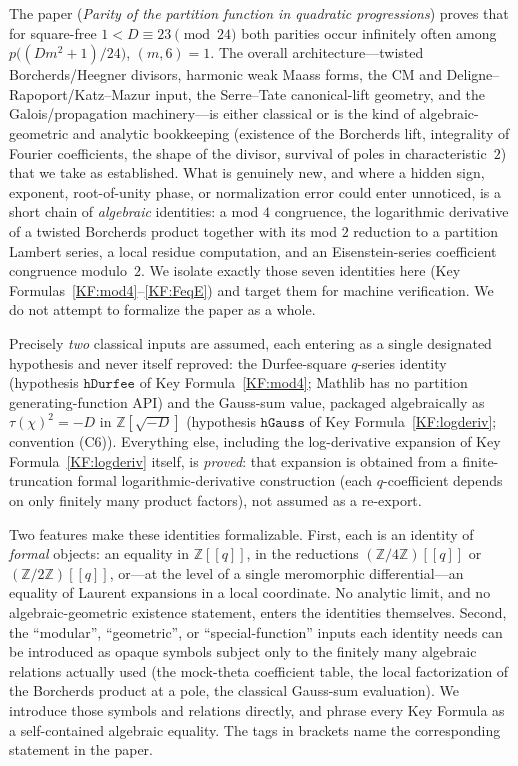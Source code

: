 \documentclass[11pt]{article}
\newcommand{\Z}{\mathbb{Z}}
\theoremstyle{definition}
\begin{document}
The paper (\emph{Parity of the partition function in quadratic progressions}) proves that
for square-free $1<D\equiv23\pmod{24}$ both parities occur infinitely often among
$p\bigl((Dm^2+1)/24\bigr)$, $(m,6)=1$. The overall architecture---twisted Borcherds/Heegner
divisors, harmonic weak Maass forms, the CM and Deligne--Rapoport/Katz--Mazur input, the
Serre--Tate canonical-lift geometry, and the Galois/propagation machinery---is either classical
or is the kind of algebraic-geometric and analytic bookkeeping (existence of the Borcherds lift,
integrality of Fourier coefficients, the shape of the divisor, survival of poles in
characteristic~$2$) that we take as established. What is genuinely new, and where a hidden sign,
exponent, root-of-unity phase, or normalization error could enter unnoticed, is a short chain of
\emph{algebraic} identities: a mod $4$ congruence, the logarithmic derivative of a twisted
Borcherds product together with its mod $2$ reduction to a partition Lambert series, a local
residue computation, and an Eisenstein-series coefficient congruence modulo~$2$. We isolate
exactly those seven identities here (Key Formulas~\ref{KF:mod4}--\ref{KF:FeqE}) and target them for
machine verification. We do not attempt to formalize the paper as a whole.

Precisely \emph{two} classical inputs are assumed, each entering as a single designated
hypothesis and never itself reproved: the Durfee-square $q$-series identity (hypothesis
$\mathtt{hDurfee}$ of Key Formula~\ref{KF:mod4}; Mathlib has no partition generating-function API)
and the Gauss-sum value, packaged algebraically as $\tau(\chi)^2=-D$ in $\Z[\sqrt{-D}]$
(hypothesis $\mathtt{hGauss}$ of Key Formula~\ref{KF:logderiv}; convention (C6)). Everything else,
including the log-derivative expansion of Key Formula~\ref{KF:logderiv} itself, is
\emph{proved}: that expansion is obtained from a finite-truncation formal logarithmic-derivative
construction (each $q$-coefficient depends on only finitely many product factors), not assumed as
a re-export.

Two features make these identities formalizable. First, each is an identity of \emph{formal}
objects: an equality in $\Z[[q]]$, in the reductions $(\Z/4\Z)[[q]]$ or $(\Z/2\Z)[[q]]$, or---at
the level of a single meromorphic differential---an equality of Laurent expansions in a local
coordinate. No analytic limit, and no algebraic-geometric existence statement, enters the
identities themselves. Second, the ``modular'', ``geometric'', or ``special-function'' inputs each
identity needs can be introduced as opaque symbols subject only to the finitely many algebraic
relations actually used (the mock-theta coefficient table, the local factorization of the
Borcherds product at a pole, the classical Gauss-sum evaluation). We introduce those symbols and
relations directly, and phrase every Key Formula as a self-contained algebraic equality. The tags
in brackets name the corresponding statement in the paper.
\end{document}
